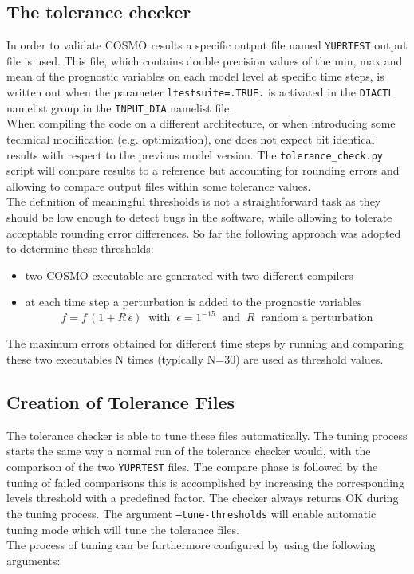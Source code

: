 \documentclass[12pt,twoside,a4paper]{report}
\begin{document}
\subsection{The tolerance checker}

In order to validate COSMO results a specific output file named \texttt{YUPRTEST} output file is used. This file, which contains double precision values of the min, max and mean of the prognostic variables on each model level at specific time steps, is written out when the parameter \texttt{ltestsuite=.TRUE.} is activated in the \texttt{DIACTL} namelist group in the \texttt{INPUT\_DIA} namelist file.\\
When compiling the code on a different architecture, or when introducing some technical modification (e.g. optimization), one does not expect bit identical results with respect to the previous model version. The \texttt{tolerance\_check.py} script will compare results to a reference but accounting for rounding errors and allowing to compare output files within some tolerance values.\\
The definition of meaningful thresholds is not a straightforward task as they should be low enough to detect bugs in the software, while allowing to tolerate acceptable rounding error differences. So far the following approach was adopted to determine these thresholds:
\begin{itemize}
	\item two COSMO executable are generated with two different compilers
	\item at each time step a perturbation is added to the prognostic variables
	\begin{equation}
	    f=f\,(1+R\,\epsilon) \; \; \mbox{with} \; \; \epsilon=1^{-15} \; \; \mbox{and} \; \; R  \; \; \mbox{random a perturbation}
	\end{equation} 
\end{itemize}

The maximum errors obtained for different time steps by running and comparing these two executables N times (typically N=30) are used as threshold values.\\

\subsection{Creation of Tolerance Files}

The tolerance checker is able to tune these files automatically. 
The tuning process starts the same way a normal run of the tolerance checker would, with the comparison of the two \texttt{YUPRTEST} files. The compare phase is followed by the tuning of failed comparisons this is accomplished by increasing the corresponding levels threshold with a predefined factor. The checker always returns {\color{green} OK} during the tuning process.
The argument \texttt{--tune-thresholds} will enable automatic tuning mode which will tune the tolerance files. \\ 
The process of tuning can be furthermore configured by using the following arguments:
\end{document}
